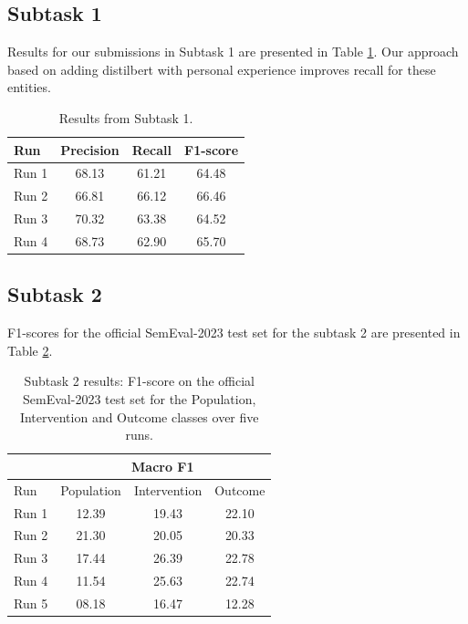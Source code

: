 \documentclass[11pt]{article}
\begin{document}
\subsection{Subtask 1}

Results for our submissions in Subtask 1 are presented in Table \ref{tab:task_1}. Our approach based on adding distilbert with personal experience improves recall for these entities.

\begin{table}[ht]
    \centering
    \begin{tabular}{lccc}
        \toprule
        Run & Precision & Recall & F1-score \\
        \midrule
        Run 1 & 68.13 & 61.21 & 64.48 \\
        Run 2 & 66.81 & 66.12 & 66.46 \\
        Run 3 & 70.32 & 63.38 & 64.52 \\
        Run 4 & 68.73 & 62.90 & 65.70 \\
        \bottomrule
    \end{tabular}
    \caption{Results from Subtask 1.}
    \label{tab:task_1}
\end{table}
%
%
%
\subsection{Subtask 2}
\label{res:task2}
%
F1-scores for the official SemEval-2023 test set for the subtask 2 are presented in Table \ref{tab:task_2}.

%
\begin{table}[ht]
    \centering
    \begin{tabular}{lccc}
        \toprule
          & \multicolumn{3}{c}{Macro F1} \\
         \hline
        Run & Population & Intervention & Outcome \\
        \midrule
        Run 1 & 12.39 & 19.43 & 22.10 \\
        Run 2 & 21.30 & 20.05 & 20.33 \\
        Run 3 & 17.44 & 26.39 & 22.78 \\
        Run 4 & 11.54 & 25.63 & 22.74 \\
        Run 5 & 08.18 & 16.47 & 12.28 \\
        \bottomrule
    \end{tabular}
    \caption{Subtask 2 results: F1-score on the official SemEval-2023 test set for the Population, Intervention and Outcome classes over five runs.}
    \label{tab:task_2}
\end{table}
\end{document}
